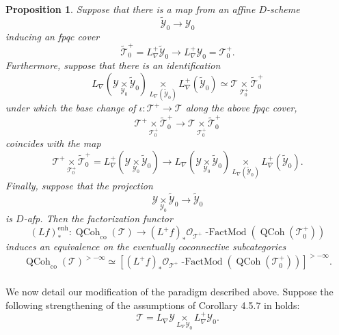 \documentclass[10pt,a4paper]{amsart}
\newtheorem{prop}[subsubsection]{Proposition}
\newcommand{\on}[1]{\operatorname{#1}}
\newcommand{\QCoh}{\on{QCoh}}
\newcommand{\sssec}[1]{\subsubsection{}}
\begin{document}
\begin{prop} \label{alg approximation} \cite{GLC2}
    Suppose that there is a map from an affine $D$-scheme
    $$
    \tilde{\mathcal{Y}}_0 \to \mathcal{Y}_0
    $$
    inducing an fpqc cover
    $$
    \tilde{\mathcal{T}}_0^+ = L_{\nabla}^+\tilde{\mathcal{Y}}_0 \to L_{\nabla}^+ \mathcal{Y}_0 = \mathcal{T}_0^+.
    $$
    Furthermore, suppose that there is an identification
    $$
    L_{\nabla}(\mathcal{Y} \underset{\mathcal{Y}_0}{\times} \tilde{\mathcal{Y}}_0) \underset{L_{\nabla}(\tilde{\mathcal{Y}}_0)}{\times} L_{\nabla}^+(\tilde{\mathcal{Y}}_0) \simeq \mathcal{T} \underset{\mathcal{T}_0^+}{\times} \tilde{\mathcal{T}}_0^+
    $$
    under which the base change of $\iota : \mathcal{T}^+ \to \mathcal{T}$ along the above fpqc cover,
    $$
    \mathcal{T}^+ \underset{\mathcal{T}_0^+}{\times} \tilde{\mathcal{T}}_0^+ \to \mathcal{T} \underset{\mathcal{T}_0^+}{\times} \tilde{\mathcal{T}}_0^+
    $$
    coincides with the map
    $$
    \mathcal{T}^+ \underset{\mathcal{T}_0^+}{\times} \tilde{\mathcal{T}}_0^+ = L_{\nabla}^+(\mathcal{Y} \underset{\mathcal{Y_0}}{\times} \tilde{\mathcal{Y}}_0) \to L_{\nabla}(\mathcal{Y} \underset{\mathcal{Y_0}}{\times} \tilde{\mathcal{Y}}_0) \underset{L_{\nabla}(\tilde{\mathcal{Y}}_0)}{\times} L_{\nabla}^+(\tilde{\mathcal{Y}}_0).
    $$
    Finally, suppose that the projection 
    $$
    \mathcal{Y} \underset{\mathcal{Y_0}}{\times} \tilde{\mathcal{Y}}_0 \to \tilde{\mathcal{Y}}_0
    $$
    is $D$-afp.
    Then the factorization functor
    $$
    (Lf)_*^{\on{enh}} : \QCoh_{\on{co}}(\mathcal{T}) \to (L^+f)_*\mathcal{O}_{\mathcal{T}^+}\on{-FactMod} (\QCoh(\mathcal{T}_0^+))
    $$
    induces an equivalence on the eventually coconnective subcategories
    $$
    \QCoh_{\on{co}}(\mathcal{T})^{>-\infty} \simeq [(L^+f)_*\mathcal{O}_{\mathcal{T}^+}\on{-FactMod} (\QCoh(\mathcal{T}_0^+))]^{>-\infty}.
    $$
\end{prop}

\sssec{}
We now detail our modification of the paradigm described above. Suppose the following strengthening of the assumptions of Corollary 4.5.7 in \cite{GLC2} holds:
$$
\mathcal{T} = L_{\nabla}\mathcal{Y} \underset{L_{\nabla}\mathcal{Y}_0}{\times} L_{\nabla}^+\mathcal{Y}_0.
$$
\end{document}
